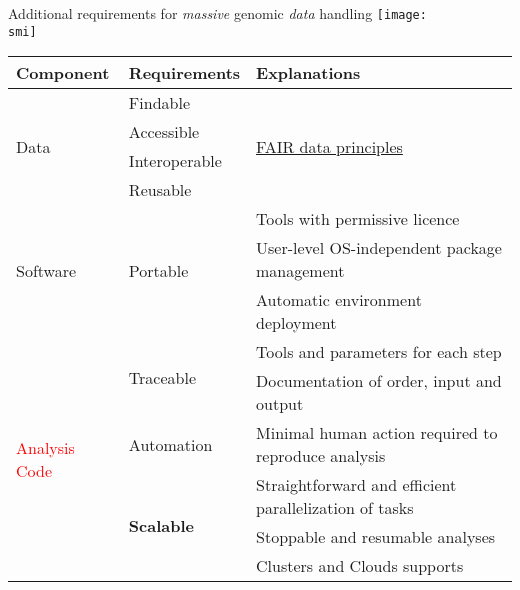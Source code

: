   \begin{frame}{Additional requirements for \emph{massive} genomic \emph{data} handling}
    \def\smi{out/ln/updir/mw-gcthesis-oral/ink/reproducibility/arrow_reproducibility.pdf}
    \texttt{[image: \\smi]}

    {\scriptsize
    \begin{tabular}{@{}lll@{}}
      \toprule
      Component                      & Requirements                & Explanations            \\ \midrule
      \multirow{4}{*}{\textcolor{NavyBlue}{Data}}          & Findable &  \multirow{4}{*}{\href{https://www.force11.org/group/fairgroup/fairprinciples}{FAIR data principles}}  \\
      & Accessible                        &       \\
      & Interoperable                    &        \\ 
      & Reusable                          &       \\ \midrule
      \multirow{3}{*}{\textcolor{OliveGreen}{Software}}             & \multirow{3}{*}{Portable} & Tools with permissive licence \\
      & & User-level OS-independent package management            \\
      & & Automatic environment deployment           \\ \midrule
      \multirow{6}{*}{\textcolor{Red}{Analysis Code}} & \multirow{2}{*}{Traceable} & Tools and parameters for each step       \\
      & & Documentation of order, input and output \\ \cmidrule(l){2-3}
      & Automation & Minimal human action required to reproduce analysis \\ \cmidrule(l){2-3} 
      & \multirow{3}{*}{\textbf{Scalable}} & Straightforward and efficient parallelization of tasks \\
      & & Stoppable and resumable analyses \\
      & & Clusters and Clouds supports \\ \bottomrule
    \end{tabular}
    }
  \end{frame}
